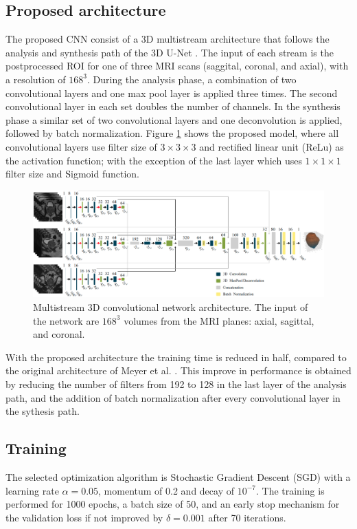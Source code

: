 \subsection{Proposed architecture}
The proposed CNN consist of a 3D multistream architecture that follows the analysis
and synthesis path of the 3D U-Net \cite{cciccek20163d}. The input of each stream is
the postprocessed ROI for one of three MRI scans (saggital, coronal, and axial), 
with a resolution of $168^3$. During the analysis phase, a combination
of two convolutional layers and one max pool layer is applied three times. The second 
convolutional layer in each set doubles the number of channels. 
In the synthesis phase a similar set of two convolutional layers and
one deconvolution is applied, followed by batch normalization.
Figure \ref{fig:nn} shows the proposed model, where 
all convolutional layers use filter size of $3 \times 3 \times 3$ and
rectified linear unit (ReLu) as the activation function; with the exception
of the last layer which uses  $1 \times 1 \times 1$ filter size and Sigmoid function. 
\begin{figure}[h]
    \centering
    \includegraphics[totalheight=.275\textheight]{imgs/methodology/NN.png}
    \caption{Multistream 3D convolutional network architecture. The input of the network
    are $168^3$ volumes from the MRI planes: axial, sagittal, and coronal. }
    \label{fig:nn}
\end{figure}

With the proposed architecture the training time is reduced in half, compared
to the original architecture of Meyer et al. \cite{anneke}. This
improve in performance is obtained by  reducing the number of filters 
from 192 to 128 in the last layer of the analysis path, and
the addition of batch normalization after every convolutional layer 
in the sythesis path.

\subsection{Training}
\label{subsec:training}
The selected optimization algorithm is Stochastic Gradient Descent (SGD) with a
learning rate $\alpha = 0.05$, momentum of 0.2 and decay of $10^{-7}$. The training is performed
for 1000 epochs, a batch size of 50, and an early stop mechanism for the validation
loss if not improved by $\delta = 0.001$ after 70 iterations. 


